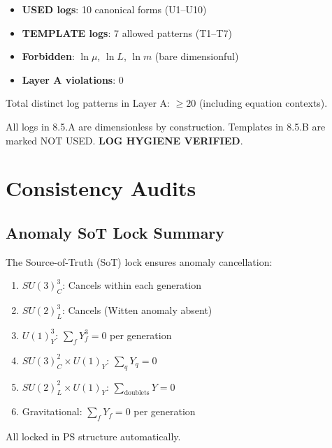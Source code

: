 \documentclass[11pt,a4paper]{article}
\begin{document}
\begin{canonbox}
\label{box:log-summary}
\begin{itemize}
    \item \textbf{USED logs}: 10 canonical forms (U1--U10)
    \item \textbf{TEMPLATE logs}: 7 allowed patterns (T1--T7)
    \item \textbf{Forbidden}: $\ln\mu$, $\ln L$, $\ln m$ (bare dimensionful)
    \item \textbf{Layer A violations}: 0
\end{itemize}
Total distinct log patterns in Layer A: $\geq 20$ (including equation contexts).
\end{canonbox}

\begin{trapbox}
\label{trap:rt10-5}
All logs in 8.5.A are dimensionless by construction. Templates in 8.5.B are marked NOT USED. \textbf{LOG HYGIENE VERIFIED}.
\end{trapbox}

\section{Consistency Audits}
\label{sec:audits}

\subsection{Anomaly SoT Lock Summary}
\label{subsec:anomaly-sot}

The Source-of-Truth (SoT) lock ensures anomaly cancellation:

\begin{canonbox}
\label{box:anomaly-sot}
\begin{enumerate}[label=\textbf{A\arabic*}]
    \item $SU(3)_C^3$: Cancels within each generation
    \item $SU(2)_L^3$: Cancels (Witten anomaly absent)
    \item $U(1)_Y^3$: $\sum_f Y_f^3 = 0$ per generation
    \item $SU(3)_C^2 \times U(1)_Y$: $\sum_q Y_q = 0$
    \item $SU(2)_L^2 \times U(1)_Y$: $\sum_{\text{doublets}} Y = 0$
    \item Gravitational: $\sum_f Y_f = 0$ per generation
\end{enumerate}
All locked in PS structure automatically.
\end{canonbox}
\end{document}
